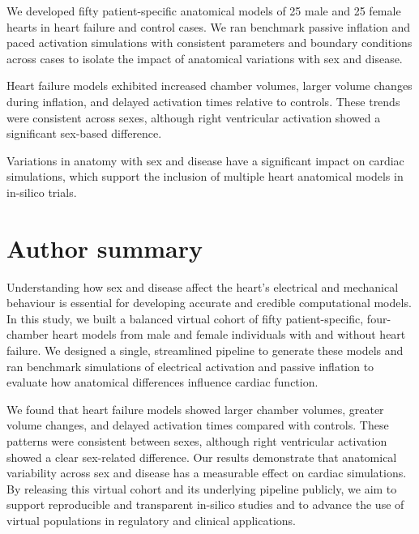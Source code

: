 \documentclass[10pt,letterpaper]{article}
\begin{document}
    We developed fifty patient-specific anatomical models of 25 male and 25 female hearts in
    heart failure and control cases.
    We ran benchmark passive inflation and paced activation simulations with consistent parameters and
    boundary conditions across cases to isolate the impact of anatomical variations with sex and disease.

    Heart failure models exhibited increased chamber volumes, larger volume changes during inflation,
    and delayed activation times relative to controls.
    These trends were consistent across sexes, although right ventricular activation showed a significant
    sex-based difference.

    Variations in anatomy with sex and disease have a significant impact on cardiac simulations,
    which support the inclusion of multiple heart anatomical models in in-silico trials.

\section*{Author summary}
Understanding how sex and disease affect the heart's electrical and mechanical behaviour is essential
for developing accurate and credible computational models.
In this study, we built a balanced virtual cohort of fifty patient-specific, four-chamber heart models
from male and female individuals with and without heart failure.
We designed a single, streamlined pipeline to generate these models and ran benchmark simulations of
electrical activation and passive inflation to evaluate how anatomical differences influence cardiac function.

We found that heart failure models showed larger chamber volumes, greater volume changes, and
delayed activation times compared with controls.
These patterns were consistent between sexes, although right ventricular activation showed a clear
sex-related difference. Our results demonstrate that anatomical variability across sex and disease
has a measurable effect on cardiac simulations.
By releasing this virtual cohort and its underlying pipeline publicly, we aim to support reproducible and
transparent in-silico studies and to advance the use of virtual populations in regulatory and clinical
applications.
\end{document}
